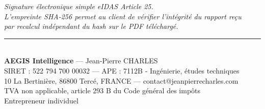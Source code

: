 \documentclass[a4paper,11pt]{article}
\begin{document}
\vspace{1em}

\begin{center}
\color{aegismuted}\footnotesize\itshape
Signature électronique simple eIDAS Article 25.\\
L'empreinte SHA-256 permet au client de vérifier l'intégrité du rapport reçu\\
par recalcul indépendant du hash sur le PDF téléchargé.
\end{center}

\vspace{2em}

\begin{center}
\color{aegismuted}\footnotesize
\rule{0.8\textwidth}{0.2pt}\\[0.5em]
\textbf{AEGIS Intelligence} --- Jean-Pierre CHARLES\\
SIRET : 522 794 700 00032 --- APE : 7112B - Ingénierie, études techniques\\
10 La Bertinière, 86800 Tercé, FRANCE --- contact@jeanpierrecharles.com\\
TVA non applicable, article 293 B du Code général des impôts\\
Entrepreneur individuel
\end{center}

\end{document}
